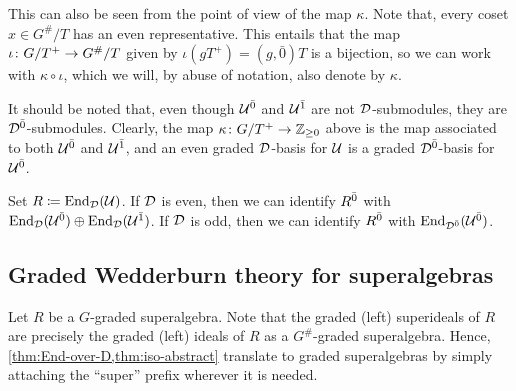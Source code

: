 This can also be seen from the point of view of the map $\kappa$. 
Note that, every coset $x \in G^\#/T$ has an even representative. 
This entails that the map $\iota\colon G/T^+ \to G^\#/T$ given by $\iota ( gT^+) = (g, \bar 0) T$ is a bijection, so we can work with $\kappa \circ \iota$, which we will, by abuse of notation, also denote by $\kappa$. 

It should be noted that, even though $\mathcal U^{\bar0}$ and $\mathcal U^{\bar1}$ are not $\mathcal{D}$-submodules, they are $\mathcal{D}^{\bar0}$-submodules. 
Clearly, the map $\kappa\colon G/T^+ \to \mathbb{Z}_{\geq 0}$ above is the map associated to both $\mathcal U^{\bar0}$ and $\mathcal U^{\bar1}$, and an even graded $\mathcal{D}$-basis for $\mathcal U$ is a graded $\mathcal{D}^{\bar0}$-basis for $\mathcal U^{\bar0}$. 

\begin{remark}\label{rmk:R-even-identificatios}
    Set $R \coloneqq \operatorname{End}_{\mathcal{D}}(\mathcal U)$. 
    If $\mathcal{D}$ is even, then we can identify $R^{\bar0}$ with $\operatorname{End}_{\mathcal{D}}(\mathcal U^{\bar0}) \oplus \operatorname{End}_{\mathcal{D}} (\mathcal U^{\bar1})$. 
    If $\mathcal{D}$ is odd, then we can identify $R^{\bar0}$ with $\operatorname{End}_{\mathcal{D}^{\bar0}}(\mathcal U^{\bar0})$. 
\end{remark}

\subsection{Graded Wedderburn theory for superalgebras}\label{ssec:wedderburn-super}

Let $R$ be a $G$-graded superalgebra. 
Note that the graded (left) superideals of $R$ are precisely the graded (left) ideals of $R$ as a $G^\#$-graded superalgebra. 
Hence, \cref{thm:End-over-D,thm:iso-abstract} translate to graded superalgebras by simply attaching the ``super'' prefix wherever it is needed. 


